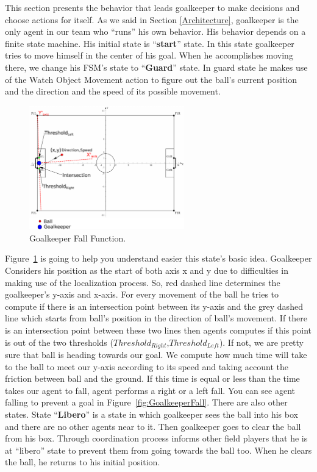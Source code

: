 This section presents the behavior that leads goalkeeper to make decisions and choose actions for itself. As we said in Section \ref{Architecture}, goalkeeper is the only agent in our team who ``runs'' his own behavior. His behavior depends on a finite state machine. His initial state is ``\textbf{start}'' state. In this state goalkeeper tries to move himself in the center of his goal. When he accomplishes moving there, we change his FSM's state to ``\textbf{Guard}'' state. In guard state he makes use of the Watch Object Movement action to figure out the ball's current position and the  direction and the speed of its possible movement.

\begin{figure}[t!]
\centering
  \includegraphics[trim = 0cm 0cm 10cm 0cm, clip,width=0.6\textwidth]{Chapter3/figures/Goalie.pdf}  
  \caption{Goalkeeper Fall Function.}
  \label{fig:Goalkeeper}
\end{figure} 

Figure~\ref{fig:Goalkeeper} is going to help you understand easier this state's basic idea. Goalkeeper Considers his position as the start of both axis x and y due to difficulties in making use of the localization process. So, red dashed line determines the goalkeeper's y-axis and x-axis. For every movement of the ball he tries to compute if there is an intersection point between its y-axis and the grey dashed line which starts from ball's position in the direction of ball's movement. If there is an intersection point between these two lines then agents computes if this point is out of the two thresholds ($Threshold_{Right}$,$Threshold_{Left}$). If not, we are pretty sure that ball is heading towards our goal. We compute how much time will take to the ball to meet our y-axis according to its speed and taking account the friction between ball and the ground. If this time is equal or less than the time takes our agent to fall, agent performs a right or a left fall. You can see agent falling to prevent a goal in Figure~\ref{fig:GoalkeeperFall}. There are also other states. State ``\textbf{Libero}'' is a state in which goalkeeper sees the ball into his box and there are no other agents near to it. Then goalkeeper goes to clear the ball from his box. Through coordination process informs other field players that he is at ``libero'' state to prevent them from going towards the ball too. When he clears the ball, he returns to his initial position. 

